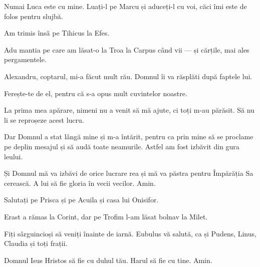 {Numai Luca este cu mine. Luați-l pe Marcu și aduceți-l cu voi, căci îmi este de folos pentru slujbă.

Am trimis însă pe Tihicus la Efes.

Adu mantia pe care am lăsat-o la Troa la Carpus când vii — și cărțile, mai ales pergamentele.

Alexandru, coptarul, mi-a făcut mult rău. Domnul îi va răsplăti după faptele lui.

Ferește-te de el, pentru că s-a opus mult cuvintelor noastre.


\par }{\PP {}La prima mea apărare, nimeni nu a venit să mă ajute, ci toți m-au părăsit. Să nu li se reproșeze acest lucru.

Dar Domnul a stat lângă mine și m-a întărit, pentru ca prin mine să se proclame pe deplin mesajul și să audă toate neamurile. Astfel am fost izbăvit din gura leului.

Și Domnul mă va izbăvi de orice lucrare rea și mă va păstra pentru Împărăția Sa cerească. A lui să fie gloria în vecii vecilor. Amin.


\par }{\PP {}Salutați pe Prisca și pe Acuila și casa lui Onisifor.

Erast a rămas la Corint, dar pe Trofim l-am lăsat bolnav la Milet.

Fiți sârguincioși să veniți înainte de iarnă. Eubulus vă salută, ca și Pudens, Linus, Claudia și toți frații.


\par }{\PP {}Domnul Isus Hristos să fie cu duhul tău. Harul să fie cu tine. Amin.


\par }
